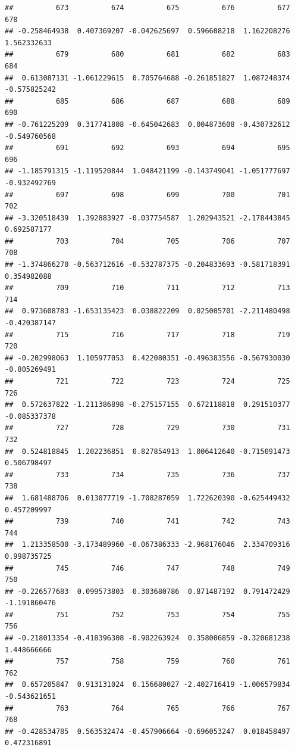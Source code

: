 \documentclass[
]{article}
\begin{document}
\begin{verbatim}
##          673          674          675          676          677          678 
## -0.258464938  0.407369207 -0.042625697  0.596608218  1.162208276  1.562332633 
##          679          680          681          682          683          684 
##  0.613087131 -1.061229615  0.705764688 -0.261851827  1.087248374 -0.575825242 
##          685          686          687          688          689          690 
## -0.761225209  0.317741808 -0.645042683  0.004873608 -0.430732612 -0.549760568 
##          691          692          693          694          695          696 
## -1.185791315 -1.119520844  1.048421199 -0.143749041 -1.051777697 -0.932492769 
##          697          698          699          700          701          702 
## -3.320518439  1.392883927 -0.037754587  1.202943521 -2.178443845  0.692587177 
##          703          704          705          706          707          708 
## -1.374866270 -0.563712616 -0.532787375 -0.204833693 -0.581718391  0.354982088 
##          709          710          711          712          713          714 
##  0.973608783 -1.653135423  0.038822209  0.025005701 -2.211480498 -0.420387147 
##          715          716          717          718          719          720 
## -0.202998063  1.105977053  0.422080351 -0.496383556 -0.567930030 -0.805269491 
##          721          722          723          724          725          726 
##  0.572637822 -1.211386898 -0.275157155  0.672118818  0.291510377 -0.085337378 
##          727          728          729          730          731          732 
##  0.524818845  1.202236851  0.827854913  1.006412640 -0.715091473  0.506798497 
##          733          734          735          736          737          738 
##  1.681488706  0.013077719 -1.708287059  1.722620390 -0.625449432  0.457209997 
##          739          740          741          742          743          744 
##  1.213358500 -3.173489960 -0.067386333 -2.968176046  2.334709316  0.998735725 
##          745          746          747          748          749          750 
## -0.226577683  0.099573803  0.303680786  0.871487192  0.791472429 -1.191860476 
##          751          752          753          754          755          756 
## -0.218013354 -0.418396308 -0.902263924  0.358006859 -0.320681238  1.448666666 
##          757          758          759          760          761          762 
##  0.657205847  0.913131024  0.156680027 -2.402716419 -1.006579834 -0.543621651 
##          763          764          765          766          767          768 
## -0.428534785  0.563532474 -0.457906664 -0.696053247  0.018458497  0.472316891 

\end{verbatim}
\end{document}
